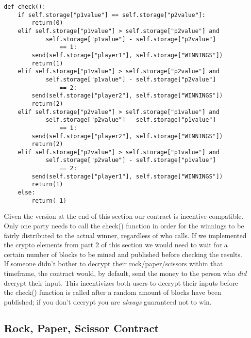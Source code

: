 \documentclass[12pt]{article}
\begin{document}
\begin{lstlisting}[frame=single]
def check():
	if self.storage["p1value"] == self.storage["p2value"]:
		return(0)
	elif self.storage["p1value"] > self.storage["p2value"] and 
			self.storage["p1value"] - self.storage["p2value"] 
				== 1:
		send(self.storage["player1"], self.storage["WINNINGS"]) 
		return(1)
	elif self.storage["p1value"] > self.storage["p2value"] and 
			self.storage["p1value"] - self.storage["p2value"] 
				== 2:
		send(self.storage["player2"], self.storage["WINNINGS"])
		return(2)
	elif self.storage["p2value"] > self.storage["p1value"] and 
			self.storage["p2value"] - self.storage["p1value"] 
				== 1:
		send(self.storage["player2"], self.storage["WINNINGS"])		
		return(2)
	elif self.storage["p2value"] > self.storage["p1value"] and 
			self.storage["p2value"] - self.storage["p1value"] 
				== 2:
		send(self.storage["player1"], self.storage["WINNINGS"])		
		return(1)
	else:
		return(-1)
\end{lstlisting}

Given the version at the end of this section our contract is incentive compatible. Only one party needs to call the check() function in order for the winnings to be fairly distributed to the actual winner, regardless of who calls. If we implemented the crypto elements from part 2 of this section we would need to wait for a certain number of blocks to be mined and published before checking the results. If someone didn’t bother to decrypt their rock/paper/scissors within that timeframe, the contract would, by default, send the money to the person who \textit{did} decrypt their input. This incentivizes both users to decrypt their inputs before the check() function is called after a random amount of blocks have been published; if you don't decrypt you are \textit{always} guaranteed not to win.

\subsection{Rock, Paper, Scissor Contract}
\end{document}
